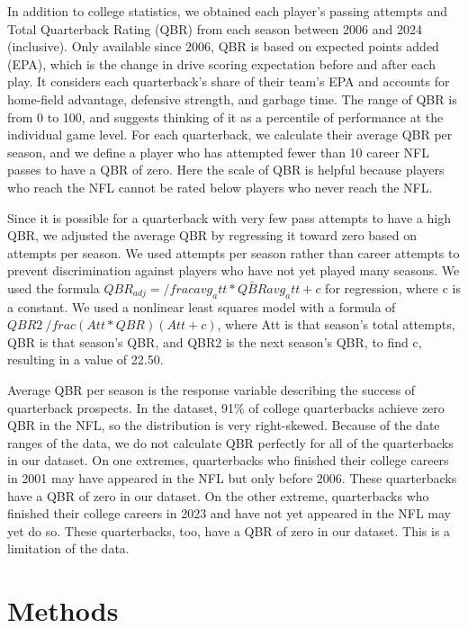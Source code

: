 \documentclass{article}
\begin{document}
In addition to college statistics, we obtained each player's passing attempts and Total Quarterback Rating (QBR) \citep{burke_how_2016} from each season between 2006 and 2024 (inclusive). Only available since 2006, QBR is based on expected points added (EPA), which is the change in drive scoring expectation before and after each play. It considers each quarterback's share of their team's EPA and accounts for home-field advantage, defensive strength, and garbage time. The range of QBR is from 0 to 100, and \citet{burke_how_2016} suggests thinking of it as a percentile of performance at the individual game level. For each quarterback, we calculate their average QBR per season, and we define a player who has attempted fewer than 10 career NFL passes to have a QBR of zero. Here the scale of QBR is helpful because players who reach the NFL cannot be rated below players who never reach the NFL. 

Since it is possible for a quarterback with very few pass attempts to have a high QBR, we adjusted the average QBR by regressing it toward zero based on attempts per season. We used attempts per season rather than career attempts to prevent discrimination against players who have not yet played many seasons. We used the formula $QBR_{adj}=/frac{avg_att*\bar{QBR}}{avg_att+c}$ for regression, where c is a constant. We used a nonlinear least squares model with a formula of $QBR2~/frac{(Att * QBR)}{(Att + c)}$, where Att is that season's total attempts, QBR is that season's QBR, and QBR2 is the next season's QBR, to find c, resulting in a value of 22.50. 

Average QBR per season is the response variable describing the success of quarterback prospects. In the dataset, 91\% of college quarterbacks achieve zero QBR in the NFL, so the distribution is very right-skewed. Because of the date ranges of the data, we do not calculate QBR perfectly for all of the quarterbacks in our dataset. On one extremes, quarterbacks who finished their college careers in 2001 may have appeared in the NFL but only before 2006. These quarterbacks have a QBR of zero in our dataset. On the other extreme, quarterbacks who finished their college careers in 2023 and have not yet appeared in the NFL may yet do so. These quarterbacks, too, have a QBR of zero in our dataset. This is a limitation of the data.

\section{Methods}
\label{sec:methods}
\end{document}

